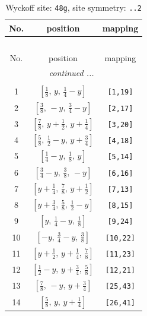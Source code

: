 \documentclass[fleqn,8pt]{jsarticle}
\begin{document}
\begin{longtable}{ccc}
\caption{Wyckoff site: {\tt 48g}, site symmetry: {\tt ..2}}
 \\
 \hline \hline
No. & position & mapping \\ \hline \endfirsthead

\multicolumn{2}{l}{\tablename\ \thetable{}} \\
 \hline \hline
No. & position & mapping \\ \hline \endhead

 \hline \hline
\multicolumn{2}{r}{\footnotesize\it continued ...} \\ \endfoot

 \hline \hline
\multicolumn{2}{r}{} \\ \endlastfoot

1 & $\left[ \frac{1}{8},\, y,\, \frac{1}{4} - y \right]$ & {\tt [1,19]} \\ \hline
2 & $\left[ \frac{3}{8},\, - y,\, \frac{3}{4} - y \right]$ & {\tt [2,17]} \\ \hline
3 & $\left[ \frac{7}{8},\, y + \frac{1}{2},\, y + \frac{1}{4} \right]$ & {\tt [3,20]} \\ \hline
4 & $\left[ \frac{5}{8},\, \frac{1}{2} - y,\, y + \frac{3}{4} \right]$ & {\tt [4,18]} \\ \hline
5 & $\left[ \frac{1}{4} - y,\, \frac{1}{8},\, y \right]$ & {\tt [5,14]} \\ \hline
6 & $\left[ \frac{3}{4} - y,\, \frac{3}{8},\, - y \right]$ & {\tt [6,16]} \\ \hline
7 & $\left[ y + \frac{1}{4},\, \frac{7}{8},\, y + \frac{1}{2} \right]$ & {\tt [7,13]} \\ \hline
8 & $\left[ y + \frac{3}{4},\, \frac{5}{8},\, \frac{1}{2} - y \right]$ & {\tt [8,15]} \\ \hline
9 & $\left[ y,\, \frac{1}{4} - y,\, \frac{1}{8} \right]$ & {\tt [9,24]} \\ \hline
10 & $\left[ - y,\, \frac{3}{4} - y,\, \frac{3}{8} \right]$ & {\tt [10,22]} \\ \hline
11 & $\left[ y + \frac{1}{2},\, y + \frac{1}{4},\, \frac{7}{8} \right]$ & {\tt [11,23]} \\ \hline
12 & $\left[ \frac{1}{2} - y,\, y + \frac{3}{4},\, \frac{5}{8} \right]$ & {\tt [12,21]} \\ \hline
13 & $\left[ \frac{7}{8},\, - y,\, y + \frac{3}{4} \right]$ & {\tt [25,43]} \\ \hline
14 & $\left[ \frac{5}{8},\, y,\, y + \frac{1}{4} \right]$ & {\tt [26,41]} \\ \hline

\end{longtable}
\end{document}

